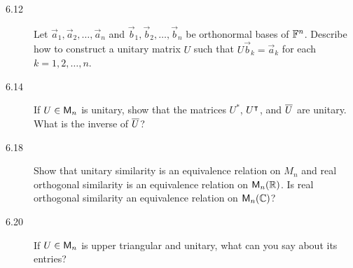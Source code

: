 \documentclass{homework}
\begin{document}
\begin{description}
  \begin{solution}

  \end{solution}

\item[6.12] Let \(\vec a_1, \vec a_2, \dots, \vec a_n\) and
  \(\vec b_1, \vec b_2, \dots, \vec b_n\) be orthonormal bases of
  \(\mathbb F^n\).  Describe how to construct a unitary matrix \(U\) such
  that \(U \vec b_k = \vec a_k\) for each \(k = 1, 2, \dots, n\).

  \begin{solution}

  \end{solution}

\item[6.14] If \(U \in \mathsf{M}_n\) is unitary, show that the matrices
  \(U^*\), \(U^\intercal\), and \(\overline{U}\) are unitary.  What is
  the inverse of \(\overline{U}\)?

  \begin{solution}

  \end{solution}

\item[6.18] Show that unitary similarity is an equivalence relation on
  \(M_n\) and real orthogonal similarity is an equivalence relation on
  \(\mathsf{M}_n (\mathbb R)\).  Is real orthogonal similarity an equivalence
  relation on \(\mathsf{M}_n (\mathbb C)\)?

  \begin{solution}

  \end{solution}

\item[6.20] If \(U \in \mathsf{M}_n\) is upper triangular and unitary, what
  can you say about its entries?

  \begin{solution}

  \end{solution}
\end{description}
\end{document}
